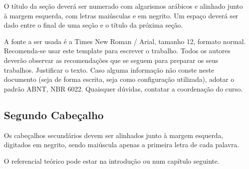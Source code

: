 \documentclass[../main.tex]{subfiles}
\begin{document}
  O  título \cite{key1}  da  seção  deverá  ser  numerado  com  algarismos  arábicos  e  alinhado  junto  à  margem  esquerda,  com  letras  maiúsculas  e  em  negrito.  Um  espaço deverá ser dado entre o final de uma seção e o título da próxima seção. 
          
  A fonte a ser usada é a Times New Roman / Arial, tamanho 12, \cite{key2} formato  normal. Recomenda-se usar este template para escrever o trabalho. Todos os  autores deverão observar as recomendações que se seguem para preparar os  seus  trabalhos.  Justificar  o  texto.  Caso  alguma  informação  não  conste  neste  documento  (seja  de  forma  escrita,  seja  como  configuração  utilizada),  adotar  o  padrão ABNT, NBR 6022. Quaisquer dúvidas, contatar a coordenação do curso.

  \subsection{Segundo Cabeçalho}
  Os cabeçalhos secundários devem ser alinhados junto à margem esquerda, digitados em negrito, sendo maiúscula apenas a primeira letra de cada palavra.

  O referencial teórico pode estar na introdução ou num capítulo seguinte.
\end{document}
